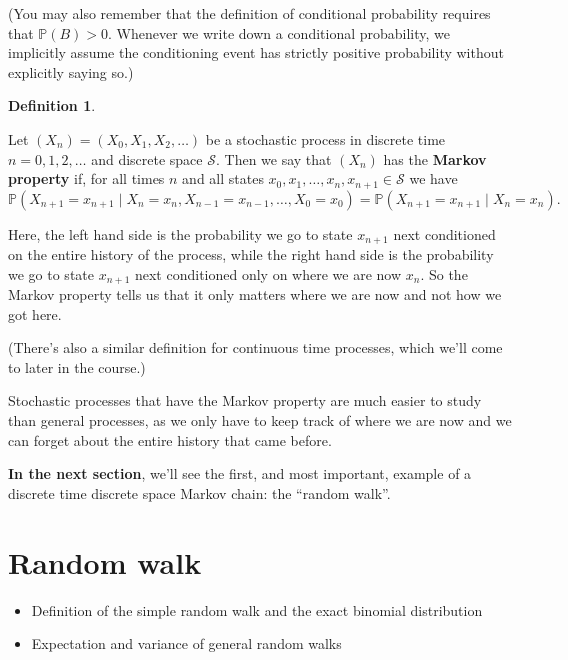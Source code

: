 \documentclass[
  a4paper,
]{article}
\providecommand{\tightlist}{%
  \setlength{\itemsep}{0pt}\setlength{\parskip}{0pt}}
\theoremstyle{definition}
\newtheorem{definition}{Definition}[section]
\theoremstyle{definition}
\theoremstyle{definition}
\theoremstyle{remark}
\begin{document}
(You may also remember that the definition of conditional probability requires that \(\mathbb P(B) > 0\). Whenever we write down a conditional probability, we implicitly assume the conditioning event has strictly positive probability without explicitly saying so.)

\begin{definition}
\protect\hypertarget{def:def-markov-property}{}\label{def:def-markov-property}

Let \((X_n) = (X_0, X_1, X_2, \dots)\) be a stochastic process in discrete time \(n = 0,1,2,\dots\) and discrete space \(\mathcal S\). Then we say that \((X_n)\) has the \textbf{Markov property} if, for all times \(n\) and all states \(x_0, x_1, \dots,x_n, x_{n+1} \in \mathcal S\) we have
\[  \mathbb P(X_{n+1}=x_{n+1} \mid X_{n}=x_{n}, X_{n-1} = x_{n-1}, \dots,X_0=x_0) = \mathbb P(X_{n+1}=x_{n+1} \mid X_{n}=x_{n}) . \]

\end{definition}

Here, the left hand side is the probability we go to state \(x_{n+1}\) next conditioned on the entire history of the process, while the right hand side is the probability we go to state \(x_{n+1}\) next conditioned only on where we are now \(x_n\). So the Markov property tells us that it only matters where we are now and not how we got here.

(There's also a similar definition for continuous time processes, which we'll come to later in the course.)

Stochastic processes that have the Markov property are much easier to study than general processes, as we only have to keep track of where we are now and we can forget about the entire history that came before.

\textbf{In the next section}, we'll see the first, and most important, example of a discrete time discrete space Markov chain: the ``random walk''.

\hypertarget{S02-random-walk}{%
\section{Random walk}\label{S02-random-walk}}

\newcommand{\Var}{\operatorname{Var}}

\begin{itemize}
\tightlist
\item
  Definition of the simple random walk and the exact binomial distribution
\item
  Expectation and variance of general random walks
\end{itemize}
\end{document}
